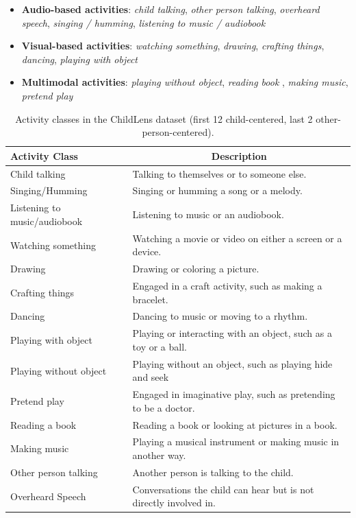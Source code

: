 \documentclass[
  man,floatsintext]{apa6}
\providecommand{\tightlist}{%
  \setlength{\itemsep}{0pt}\setlength{\parskip}{0pt}}
\begin{document}
\begin{itemize}
\tightlist
\item
  \textbf{Audio-based activities}: \emph{child talking}, \emph{other person talking}, \emph{overheard speech}, \emph{singing / humming}, \emph{listening to music / audiobook}
\item
  \textbf{Visual-based activities}: \emph{watching something}, \emph{drawing}, \emph{crafting things}, \emph{dancing}, \emph{playing with object}
\item
  \textbf{Multimodal activities}: \emph{playing without object}, \emph{reading book} , \emph{making music}, \emph{pretend play}
\end{itemize}

\begin{table}[tbp]

\begin{center}
\begin{threeparttable}

\caption{\label{tab:activity-classes-description}Activity classes in the ChildLens dataset (first 12 child-centered, last 2 other-person-centered).}

\begin{tabular}{ll}
\toprule
Activity Class & \multicolumn{1}{c}{Description}\\
\midrule
Child talking & Talking to themselves or to someone else.\\
Singing/Humming & Singing or humming a song or a melody.\\
Listening to music/audiobook & Listening to music or an audiobook.\\
Watching something & Watching a movie or video on either a screen or a device.\\
Drawing & Drawing or coloring a picture.\\
Crafting things & Engaged in a craft activity, such as making a bracelet.\\
Dancing & Dancing to music or moving to a rhythm.\\
Playing with object & Playing or interacting with an object, such as a toy or a ball.\\
Playing without object & Playing without an object, such as playing hide and seek\\
Pretend play & Engaged in imaginative play, such as pretending to be a doctor.\\
Reading a book & Reading a book or looking at pictures in a book.\\
Making music & Playing a musical instrument or making music in another way.\\
Other person talking & Another person is talking to the child.\\
Overheard Speech & Conversations the child can hear but is not directly involved in.\\
\bottomrule
\end{tabular}

\end{threeparttable}
\end{center}

\end{table}
\end{document}
